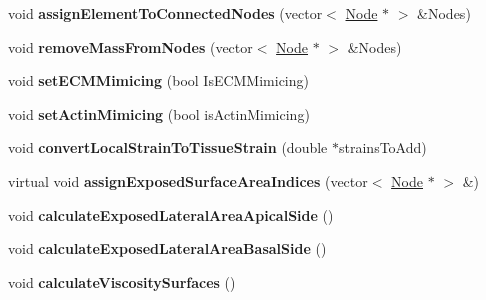 \begin{DoxyCompactItemize}
\item 
\hypertarget{classShapeBase_a20cc141f0484b0c488619ef6727eb820}{}void {\bfseries assign\+Element\+To\+Connected\+Nodes} (vector$<$ \hyperlink{classNode}{Node} $\ast$ $>$ \&Nodes)\label{classShapeBase_a20cc141f0484b0c488619ef6727eb820}

\item 
\hypertarget{classShapeBase_a6d09a632b94b324a3bde18a43b31adb8}{}void {\bfseries remove\+Mass\+From\+Nodes} (vector$<$ \hyperlink{classNode}{Node} $\ast$ $>$ \&Nodes)\label{classShapeBase_a6d09a632b94b324a3bde18a43b31adb8}

\item 
\hypertarget{classShapeBase_a48f114984fe31a847a9b5485d4622ca1}{}void {\bfseries set\+E\+C\+M\+Mimicing} (bool Is\+E\+C\+M\+Mimicing)\label{classShapeBase_a48f114984fe31a847a9b5485d4622ca1}

\item 
\hypertarget{classShapeBase_ac42c9ed461be059e0558740ed965a8d6}{}void {\bfseries set\+Actin\+Mimicing} (bool is\+Actin\+Mimicing)\label{classShapeBase_ac42c9ed461be059e0558740ed965a8d6}

\item 
\hypertarget{classShapeBase_ad023a96503929e72c59adb2b7ba8fcdf}{}void {\bfseries convert\+Local\+Strain\+To\+Tissue\+Strain} (double $\ast$strains\+To\+Add)\label{classShapeBase_ad023a96503929e72c59adb2b7ba8fcdf}

\item 
\hypertarget{classShapeBase_ab3b44c25be3950c094c5eaee16d3716d}{}virtual void {\bfseries assign\+Exposed\+Surface\+Area\+Indices} (vector$<$ \hyperlink{classNode}{Node} $\ast$ $>$ \&)\label{classShapeBase_ab3b44c25be3950c094c5eaee16d3716d}

\item 
\hypertarget{classShapeBase_ad1b05163ccd8be1e0be597a1adcfaa61}{}void {\bfseries calculate\+Exposed\+Lateral\+Area\+Apical\+Side} ()\label{classShapeBase_ad1b05163ccd8be1e0be597a1adcfaa61}

\item 
\hypertarget{classShapeBase_af8dd13be97a9a6a6c99636d7410fff87}{}void {\bfseries calculate\+Exposed\+Lateral\+Area\+Basal\+Side} ()\label{classShapeBase_af8dd13be97a9a6a6c99636d7410fff87}

\item 
\hypertarget{classShapeBase_a384ff1314700f9c7157e702c277d2819}{}void {\bfseries calculate\+Viscosity\+Surfaces} ()\label{classShapeBase_a384ff1314700f9c7157e702c277d2819}


\end{DoxyCompactItemize}
